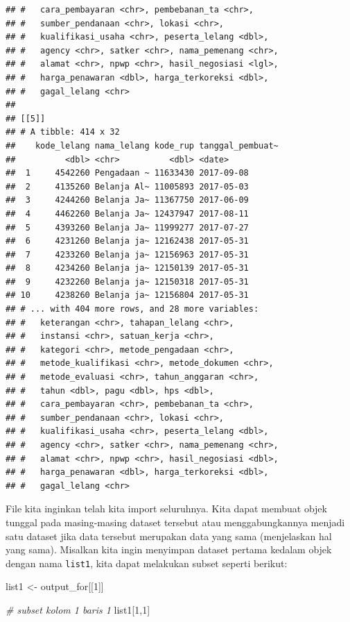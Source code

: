 \documentclass[]{book}
\newenvironment{Shaded}{\begin{snugshade}}{\end{snugshade}}
\newcommand{\DecValTok}[1]{\textcolor[rgb]{0.00,0.00,0.81}{#1}}
\newcommand{\StringTok}[1]{\textcolor[rgb]{0.31,0.60,0.02}{#1}}
\newcommand{\CommentTok}[1]{\textcolor[rgb]{0.56,0.35,0.01}{\textit{#1}}}
\newcommand{\NormalTok}[1]{#1}
\begin{document}
\begin{verbatim}
## #   cara_pembayaran <chr>, pembebanan_ta <chr>,
## #   sumber_pendanaan <chr>, lokasi <chr>,
## #   kualifikasi_usaha <chr>, peserta_lelang <dbl>,
## #   agency <chr>, satker <chr>, nama_pemenang <chr>,
## #   alamat <chr>, npwp <chr>, hasil_negosiasi <lgl>,
## #   harga_penawaran <dbl>, harga_terkoreksi <dbl>,
## #   gagal_lelang <chr>
## 
## [[5]]
## # A tibble: 414 x 32
##    kode_lelang nama_lelang kode_rup tanggal_pembuat~
##          <dbl> <chr>          <dbl> <date>          
##  1     4542260 Pengadaan ~ 11633430 2017-09-08      
##  2     4135260 Belanja Al~ 11005893 2017-05-03      
##  3     4244260 Belanja Ja~ 11367750 2017-06-09      
##  4     4462260 Belanja Ja~ 12437947 2017-08-11      
##  5     4393260 Belanja Ja~ 11999277 2017-07-27      
##  6     4231260 Belanja ja~ 12162438 2017-05-31      
##  7     4233260 Belanja ja~ 12156963 2017-05-31      
##  8     4234260 Belanja ja~ 12150139 2017-05-31      
##  9     4232260 Belanja ja~ 12150318 2017-05-31      
## 10     4238260 Belanja ja~ 12156804 2017-05-31      
## # ... with 404 more rows, and 28 more variables:
## #   keterangan <chr>, tahapan_lelang <chr>,
## #   instansi <chr>, satuan_kerja <chr>,
## #   kategori <chr>, metode_pengadaan <chr>,
## #   metode_kualifikasi <chr>, metode_dokumen <chr>,
## #   metode_evaluasi <chr>, tahun_anggaran <chr>,
## #   tahun <dbl>, pagu <dbl>, hps <dbl>,
## #   cara_pembayaran <chr>, pembebanan_ta <chr>,
## #   sumber_pendanaan <chr>, lokasi <chr>,
## #   kualifikasi_usaha <chr>, peserta_lelang <dbl>,
## #   agency <chr>, satker <chr>, nama_pemenang <chr>,
## #   alamat <chr>, npwp <chr>, hasil_negosiasi <dbl>,
## #   harga_penawaran <dbl>, harga_terkoreksi <dbl>,
## #   gagal_lelang <chr>
\end{verbatim}

File kita inginkan telah kita import seluruhnya. Kita dapat membuat
objek tunggal pada masing-masing dataset tersebut atau menggabungkannya
menjadi satu dataset jika data tersebut merupakan data yang sama
(menjelaskan hal yang sama). Misalkan kita ingin menyimpan dataset
pertama kedalam objek dengan nama \texttt{list1}, kita dapat melakukan
subset seperti berikut:

\begin{Shaded}
\begin{Highlighting}[]
\NormalTok{list1 <-}\StringTok{ }\NormalTok{output_for[[}\DecValTok{1}\NormalTok{]]}

\CommentTok{# subset kolom 1 baris 1}
\NormalTok{list1[}\DecValTok{1}\NormalTok{,}\DecValTok{1}\NormalTok{]}
\end{Highlighting}
\end{Shaded}
\end{document}

